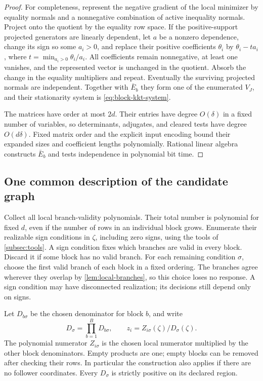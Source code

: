 \begin{proof}
For completeness, represent the negative gradient of the local minimizer
by equality normals and a nonnegative combination of active inequality
normals. Project onto the quotient by the equality row space. If the
positive-support projected generators are linearly dependent, let $a$
be a nonzero dependence, change its sign so some $a_i>0$, and replace
their positive coefficients $\theta_i$ by $\theta_i-ta_i$, where
$t=\min_{a_i>0}\theta_i/a_i$. All coefficients remain nonnegative,
at least one vanishes, and the represented vector is unchanged in the
quotient. Absorb the change in the equality multipliers and repeat.
Eventually the surviving projected normals are independent. Together
with $\bar E_b$ they form one of the enumerated $V_J$, and their
stationarity system is \eqref{eq:block-kkt-system}.

The matrices have order at most $2d$. Their entries have degree
$O(\delta)$ in a fixed number of variables, so determinants, adjugates,
and cleared tests have degree $O(d\delta)$. Fixed matrix order and the
explicit input encoding bound their expanded sizes and coefficient
lengths polynomially. Rational linear algebra constructs $\bar E_b$
and tests independence in polynomial bit time.
\end{proof}

\subsection{One common description of the candidate graph}\label{subsec:candidate-graph}

Collect all local branch-validity polynomials. Their total number is
polynomial for fixed $d$, even if the number of rows in an individual
block grows. Enumerate their realizable sign conditions in $\zeta$,
including zero signs, using the tools of \cref{subsec:tools}. A sign
condition fixes which branches are valid in every block. Discard it if
some block has no valid branch. For each remaining condition $\sigma$,
choose the first valid branch of each block in a fixed ordering. The
branches agree wherever they overlap by \cref{lem:local-branches}, so
this choice loses no response. A sign condition may have disconnected
realization; its decisions still depend only on signs.

Let $D_{b\sigma}$ be the chosen denominator for block $b$, and write
\begin{equation}\label{eq:common-response-denominator}
 D_\sigma=\prod_{b=1}^B D_{b\sigma},\qquad
 z_i=Z_{i\sigma}(\zeta)/D_\sigma(\zeta).
\end{equation}
The polynomial numerator $Z_{i\sigma}$ is the chosen local numerator
multiplied by the other block denominators. Empty products are one; empty
blocks can be removed after checking their rows. In particular the
construction also applies if there are no follower coordinates.
Every $D_\sigma$ is strictly positive on its declared region.

